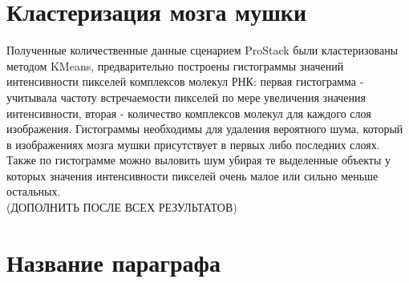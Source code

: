 \section{Кластеризация мозга мушки}
Полученные количественные данные сценарием ProStack были кластеризованы методом KMeans, предварительно построены гистограммы значений интенсивности пикселей комплексов молекул РНК: первая гистограмма - учитывала частоту встречаемости пикселей по мере увеличения значения интенсивности, вторая - количество комплексов молекул для каждого слоя изображения. Гистограммы необходимы для удаления вероятного шума,  который в изображениях мозга мушки присутствует в первых либо последних слоях. Также по гистограмме можно выловить шум убирая те выделенные объекты у которых значения интенсивности пикселей очень малое или сильно меньше остальных.\\
(ДОПОЛНИТЬ ПОСЛЕ ВСЕХ РЕЗУЛЬТАТОВ)




\section{Название параграфа} \label{ch3:sec2}







%
